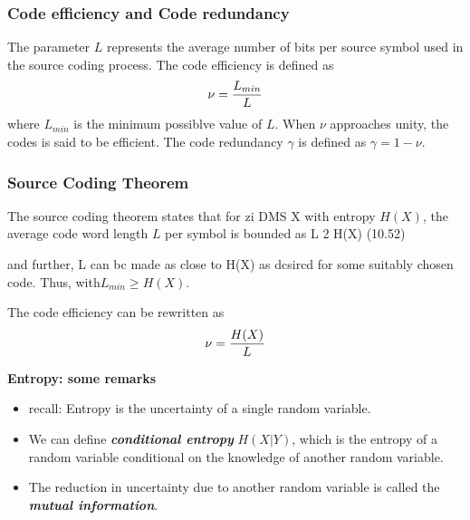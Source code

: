 


\begin{frame}
\frametitle{Code efficiency and Code redundancy}
The parameter $L$ represents the average number of bits per source symbol used in the source coding process.
The code efficiency is defined as \[\nu = {L_{min} \over L} \]where $L_{min}$ is the minimum possiblve value of $L$. When $\nu$ approaches unity, the codes is said to be efficient.
The code redundancy $\gamma$ is defined as $\gamma = 1- \nu$.
\end{frame}


\begin{frame}
\frametitle{Source Coding Theorem}
The source coding theorem states that for zi DMS X with entropy $H(X)$, the average code word length $L$ per symbol is bounded as
L 2 H(X) (10.52)

and further, L can bc made as close to H(X) as dcsircd for some suitably chosen code.
Thus, with$ L_{min} \geq H(X)$.

The code efficiency can be rewritten as
\[\nu = {H(X) \over L} \]
\end{frame}



{
\noindent \textbf{Entropy: some remarks}
\begin{itemize}
\item recall: Entropy is the uncertainty of a single random variable. \item We can define \textbf{\emph{conditional entropy }}$H(X|Y)$, which is the entropy of a random variable
conditional on the knowledge of another random variable. \item The reduction in uncertainty due to another random variable is called the \textbf{\emph{mutual information}}.
\end{itemize}
}



